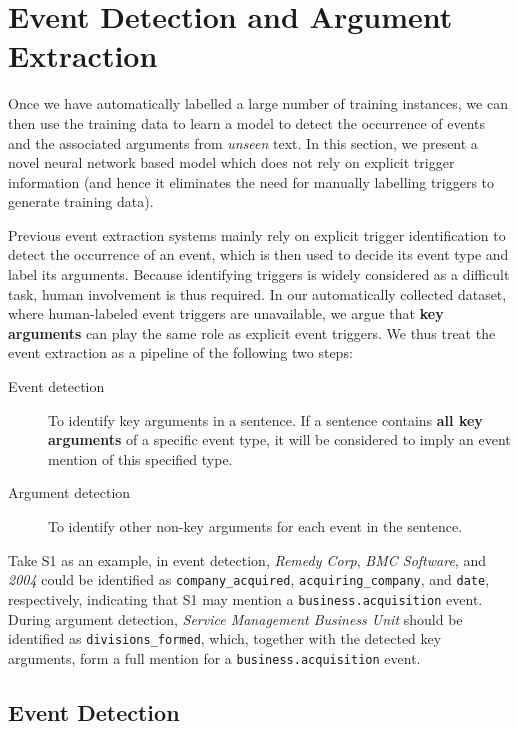 \section{Event Detection and Argument Extraction}
Once we have automatically labelled a large number of training instances, we can then use the training data to learn a model to detect the
occurrence of events and the associated arguments from \emph{unseen} text. In this section, we present a novel neural network based model
 which does not rely on explicit trigger information (and hence it eliminates the need for manually labelling triggers to generate
 training data).

Previous event extraction systems mainly rely on explicit trigger identification to detect the occurrence of an event, which is then used
to decide its event type and label its arguments. Because identifying triggers is widely considered as a difficult task, human involvement
is thus required\FIXME{~\cite{}}. In our automatically collected dataset, where human-labeled event triggers are unavailable, we argue that
\textbf{key arguments} can play the same role as explicit event triggers. We thus treat the event extraction as a pipeline of the following
two steps:

\begin{description}
	\item [Event detection]  To identify key arguments in a sentence. If a sentence contains \textbf{all key arguments} of a specific event type, it will be considered to imply an event mention of this specified type.
	\item [Argument detection] To identify other non-key arguments for each event in the sentence.
\end{description}
%
Take S1 as an example, in event detection, \emph{Remedy Corp}, \emph{BMC Software}, and \emph{2004} could be identified as
\texttt{company\_acquired}, \texttt{acquiring\_company}, and \texttt{date}, respectively, indicating that S1 may mention a
\texttt{business.acquisition} event. During argument detection, \emph{Service Management Business Unit} should be identified as
\texttt{divisions\_formed}, which, together with the detected key arguments, form a full mention for a \texttt{business.acquisition} event.

\subsection{Event Detection \label{evede}}

